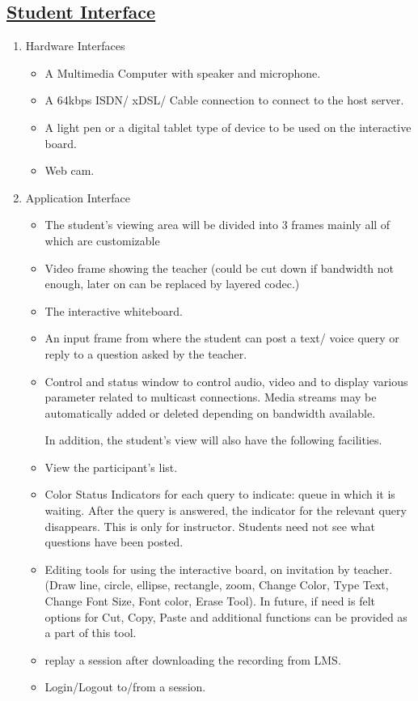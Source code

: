 \documentclass{article}
\begin{document}
\begin{enumerate}
\subsection*{\underline{Student Interface}}
\begin{enumerate}
\item Hardware Interfaces
\begin{itemize}
\item A Multimedia Computer with speaker and microphone.  
\item A 64kbps ISDN/ xDSL/ Cable connection to connect to the host server. 
\item A light pen or a digital tablet type of device to be used on the interactive board. 
\item Web cam.
\end{itemize}
\item
Application Interface
\begin{itemize}
\item The student's viewing area will be divided into 3 frames mainly all of which are customizable 
\item Video frame showing the teacher (could be cut down if bandwidth not enough, later on can be replaced by layered codec.) 
\item The interactive whiteboard. 
\item An input frame from where the student can post a text/ voice query or reply to a question asked by the teacher. 
\item Control and status window to control audio, video and to display various parameter related to multicast connections. Media streams may be automatically added or deleted depending on bandwidth available. 

 In addition, the student's view will also have the following facilities. 

\item View the participant's list. 
\item Color Status Indicators for each query to indicate: queue in which it is waiting. After the query is answered, the indicator for the relevant query disappears. This is only for instructor. Students need not see what questions have been posted.
\item Editing tools for using the interactive board, on invitation by teacher. (Draw line, circle, ellipse, rectangle, zoom, Change Color, Type Text, Change Font Size, Font color, Erase Tool). In future, if need is felt options for Cut, Copy, Paste and additional functions can be provided as a part of this tool. 
\item replay a session after downloading the recording from LMS.
\item Login/Logout to/from a session.
\end{itemize} 
\end{enumerate}

\end{enumerate}
\end{document}
